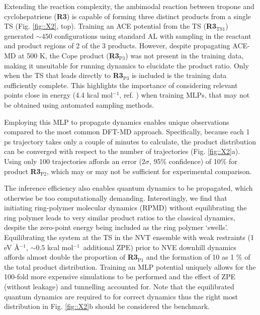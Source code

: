 \documentclass[twoside,twocolumn,9pt]{article}
\newcommand{\kcal}{kcal mol$^{-1}$}
\begin{document}
Extending the reaction complexity, the ambimodal reaction between tropone and cyclohepatriene ({\bfseries{R3}}) is capable of forming three distinct products from a single TS (Fig. \ref{fig::X2}, top).\cite{Jamieson2021} Training an ACE potential from the TS ({\bfseries{R3$_\text{TS1}$}}) generated $\sim450$ configurations using standard AL with sampling in the reactant and product regions of 2 of the 3 products. However, despite propagating ACE-MD at 500 K, the Cope product ({\bfseries{R3$_\text{P3}$}}) was not present in the training data, making it unsuitable for running dynamics to elucidate the product ratio. Only when the TS that leads directly to {\bfseries{R3$_\text{P3}$}} is included is the training data sufficiently complete. This highlights the importance of considering relevant points close in energy (4.4 \kcal, ref. ) when training MLPs, that may not be obtained using automated sampling methods. 

Employing this MLP to propagate dynamics enables unique observations compared to the most common DFT-MD approach. Specifically, because each 1 ps trajectory takes only a couple of minutes to calculate, the product distribution can be converged with respect to the number of trajectories (Fig. \ref{fig::X2}a). Using only 100 trajectories affords an error ($2\sigma$, 95\% confidence) of 10\% for product {\bfseries{R3$_\text{P2}$}}, which may or may not be sufficient for experimental comparison.

The inference efficiency also enables quantum dynamics to be propagated, which otherwise be too computationally demanding. Interestingly, we find that initiating ring-polymer molecular dynamics (RPMD)\cite{Habershon2013} without equilibrating the ring polymer leads to very similar product ratios to the classical dynamics, despite the zero-point energy being included as the ring polymer `swells’. Equilibrating the system at the TS in the NVT ensemble with weak restraints (1 eV \AA$^{-1}$, $\sim0.5$ \kcal~additional ZPE) prior to NVE downhill dynamics affords almost double the proportion of {\bfseries{R3$_\text{P1}$}} and the formation of 10 as 1 \% of the total product distribution. Training an MLP potential uniquely allows for the 100-fold more expensive simulations to be performed and the effect of ZPE (without leakage\cite{Lee2018}) and tunnelling accounted for. Note that the equilibrated quantum dynamics are required to for correct dynamics\cite{Liu2019} thus the right most distribution in Fig. \ref{fig::X2}b should be considered the benchmark.
\end{document}
